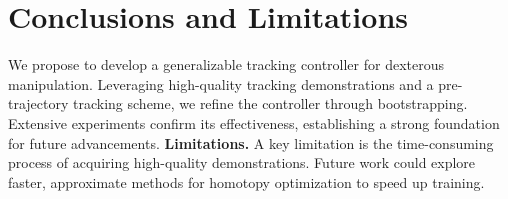 \section{Conclusions and Limitations}


We propose \modelname to develop a generalizable tracking controller for dexterous manipulation. Leveraging high-quality tracking demonstrations and a pre-trajectory tracking scheme, we refine the controller through bootstrapping. Extensive experiments confirm its effectiveness, establishing a strong foundation for future advancements. \noindent\textbf{Limitations.} A key limitation is the time-consuming process of acquiring high-quality demonstrations. Future work could explore faster, approximate methods for homotopy optimization to speed up training.



